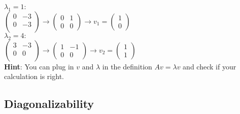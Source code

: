 \documentclass[10pt,a4paper]{article}
\begin{document}
$\lambda_1=1:$\\
$\left(\begin{array}{cc}
0 & -3 \\
0 & -3 \\
\end{array} \right) \rightarrow
\left(\begin{array}{cc}
0 & 1 \\
0 & 0
\end{array} \right)
\rightarrow
v_1 = \left( \begin{array}{c}
1 \\ 0
\end{array} \right)
$\\
$\lambda_2=4:$\\
$\left(\begin{array}{cc}
3 & -3 \\
0 & 0 \\
\end{array} \right) \rightarrow
\left( \begin{array}{cc}
1 & - 1 \\
0 & 0
\end{array} \right) \rightarrow
v_2 = \left( \begin{array}{c}
1 \\1
\end{array} \right)
$ \\
\textbf{Hint}: You can plug in $v$ and $\lambda$ in the definition $A v = \lambda v$ and check if your calculation is right.
\subsection{Diagonalizability}
\end{document}
